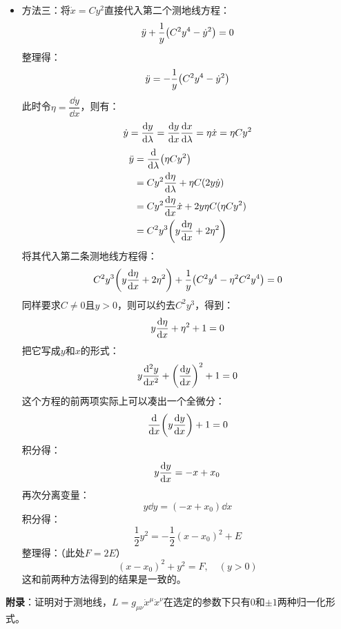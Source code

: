 \documentclass[a4paper]{article}
\begin{document}
\begin{enumerate}
\begin{enumerate}
\begin{itemize}
            \item 方法三：将$\dot{x} = C y^2$直接代入第二个测地线方程：
            \[
                \ddot{y} + \frac{1}{y} \qty(C^2 y^4 - \dot{y}^2) = 0
            \]
            整理得：
            \[
                \ddot{y} = -\frac{1}{y} \qty(C^2 y^4 - \dot{y}^2)
            \]
            此时令$\eta = \dfrac{\dd{y}}{\dd{x}}$，则有：
            \[
                \dot{y} = \dv{y}{\lambda} = \dv{y}{x} \dv{x}{\lambda} = \eta \dot{x} = \eta C y^2
            \]
            \begin{align*}
                \ddot{y}
                &= \dv{\lambda} \qty(\eta C y^2) \\
                &= C y^2 \dv{\eta}{\lambda} + \eta C (2y \dot{y}) \\
                &= C y^2 \dv{\eta}{x} \dot{x} + 2y \eta C (\eta C y^2) \\
                &= C^2 y^3 \qty(y \dv{\eta}{x} + 2 \eta^2)
            \end{align*}
            将其代入第二条测地线方程得：
            \[
                C^2 y^3 \qty(y \dv{\eta}{x} + 2 \eta^2) + \frac{1}{y} \qty(C^2 y^4 - \eta^2 C^2 y^4) = 0
            \]
            同样要求$C \neq 0$且$y > 0$，则可以约去$C^2 y^3$，得到：
            \[
                y \dv{\eta}{x} + \eta^2 + 1 = 0
            \]
            把它写成$y$和$x$的形式：
            \[
                y \dv[2]{y}{x} + \qty(\dv{y}{x})^2 + 1 = 0
            \]
            这个方程的前两项实际上可以凑出一个全微分：
            \[
                \dv{x} \qty(y \dv{y}{x}) + 1 = 0
            \]
            积分得：
            \[
                y \dv{y}{x} = -x + x_0
            \]
            再次分离变量：
            \[
                y \dd{y} = (-x + x_0) \dd{x}
            \]
            积分得：
            \[
                \frac{1}{2} y^2 = -\frac{1}{2} (x - x_0)^2 + E
            \]
            整理得：（此处$F = 2E$）
            \[
                (x - x_0)^2 + y^2 = F,\quad (y > 0)
            \]
            这和前两种方法得到的结果是一致的。
        \end{itemize}
        \textbf{附录}：证明对于测地线，$L = g_{\mu\nu} \dot{x}^\mu \dot{x}^\nu$在选定的参数下只有0和$\pm1$两种归一化形式。


\end{enumerate}
\end{enumerate}
\end{document}

